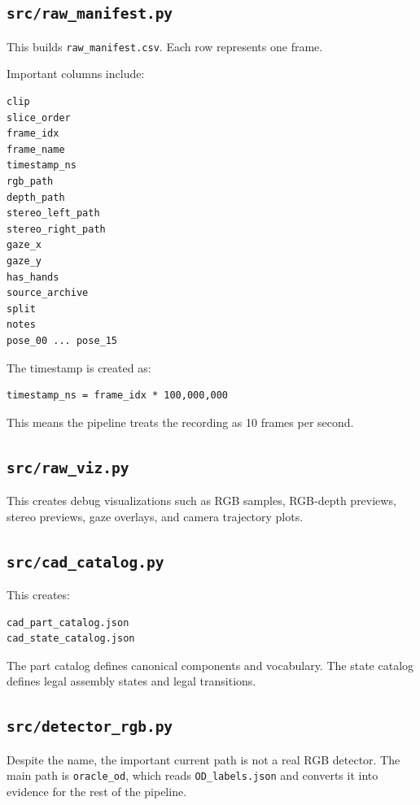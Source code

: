 \documentclass[11pt,a4paper]{article}
\begin{document}
\subsection{\texttt{src/raw\_manifest.py}}

This builds \texttt{raw\_manifest.csv}. Each row represents one frame.

Important columns include:

\begin{lstlisting}
clip
slice_order
frame_idx
frame_name
timestamp_ns
rgb_path
depth_path
stereo_left_path
stereo_right_path
gaze_x
gaze_y
has_hands
source_archive
split
notes
pose_00 ... pose_15
\end{lstlisting}

The timestamp is created as:

\begin{lstlisting}
timestamp_ns = frame_idx * 100,000,000
\end{lstlisting}

This means the pipeline treats the recording as 10 frames per second.

\subsection{\texttt{src/raw\_viz.py}}

This creates debug visualizations such as RGB samples, RGB-depth previews, stereo previews, gaze overlays, and camera trajectory plots.

\subsection{\texttt{src/cad\_catalog.py}}

This creates:

\begin{lstlisting}
cad_part_catalog.json
cad_state_catalog.json
\end{lstlisting}

The part catalog defines canonical components and vocabulary. The state catalog defines legal assembly states and legal transitions.

\subsection{\texttt{src/detector\_rgb.py}}

Despite the name, the important current path is not a real RGB detector. The main path is \texttt{oracle\_od}, which reads \texttt{OD\_labels.json} and converts it into evidence for the rest of the pipeline.
\end{document}
